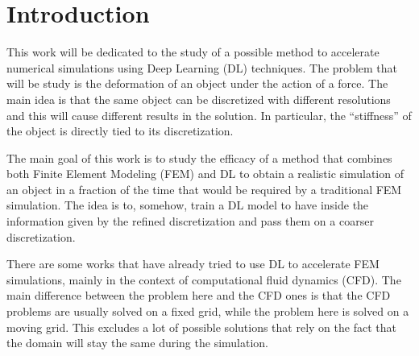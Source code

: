 \section{Introduction}
This work will be dedicated to the study of a possible method to accelerate numerical simulations using Deep Learning (DL) techniques. The problem that will be study is the deformation of an object under the action of a force. The main idea is that the same object can be discretized with different resolutions and this will cause different results in the solution. In particular, the ``stiffness'' of the object is directly tied to its discretization. 

The main goal of this work is to study the efficacy of a method that combines both Finite Element Modeling (FEM) and DL to obtain a realistic simulation of an object in a fraction of the time that would be required by a traditional FEM simulation. The idea is to, somehow, train a DL model to have inside the information given by the refined discretization and pass them on a coarser discretization.

There are some works that have already tried to use DL to accelerate FEM simulations, mainly in the context of computational fluid dynamics (CFD). The main difference between the problem here and the CFD ones is that the CFD problems are usually solved on a fixed grid, while the problem here is solved on a moving grid. This excludes a lot of possible solutions that rely on the fact that the domain will stay the same during the simulation.\citep{Allaire_1992}
